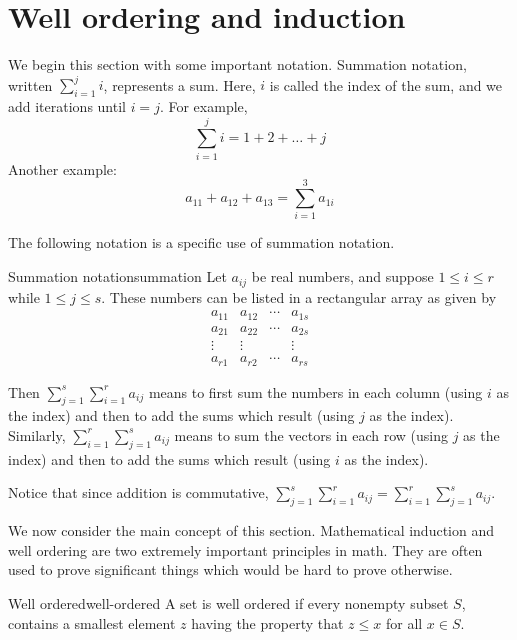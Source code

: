 \section{Well ordering and induction}

\label{well-ordering-section}

We begin this section with some important notation. Summation notation, written $\sum_{i=1}^{j} i$, represents a sum. Here, $i$ is called the index of the sum, and we add iterations until $i=j$. For example, 
\[
\sum_{i=1}^{j} i = 1 + 2 + \ldots + j 
\]
Another example: 
\[
a_{11} + a_{12} + a_{13}  = \sum_{i=1}^{3} a_{1i}
\]

The following notation is a specific use of summation notation. 

\begin{notation}{Summation notation}{summation}
Let $a_{ij}$ be real numbers, and suppose  $1\leq i\leq r$ while $
1\leq j\leq s$. These numbers can be listed in a rectangular array as given by 
\begin{equation*}
\begin{array}{cccc}
a_{11} & a_{12} & \cdots & a_{1s} \\ 
a_{21} & a_{22} & \cdots & a_{2s} \\ 
\vdots & \vdots &  & \vdots \\ 
a_{r1} & a_{r2} & \cdots & a_{rs}
\end{array}
\end{equation*}

Then $\sum_{j=1}^{s}\sum_{i=1}^{r} a_{ij}$ means to first sum the numbers
in each column (using $i$ as the index) and then to add the sums which result (using $j$ as the index). Similarly,  
$\sum_{i=1}^{r}\sum_{j=1}^{s} a_{ij}$ means to sum the vectors in
each row (using $j$ as the index) and then to add the sums which result (using $i$ as the index). 
\end{notation}

Notice that since addition is commutative, $\sum_{j=1}^{s}\sum_{i=1}^{r} a_{ij} = \sum_{i=1}^{r}\sum_{j=1}^{s} a_{ij}$. 

We now consider the main concept of this section. Mathematical induction and well ordering are two extremely important
principles in math. They are often used to prove significant things which
would be hard to prove otherwise.

\begin{definition}{Well ordered}{well-ordered}
 A set is well ordered if every nonempty subset $S$, contains a
smallest element $z$ having the property that $z\leq x$ for all $x\in S$.
\end{definition}

